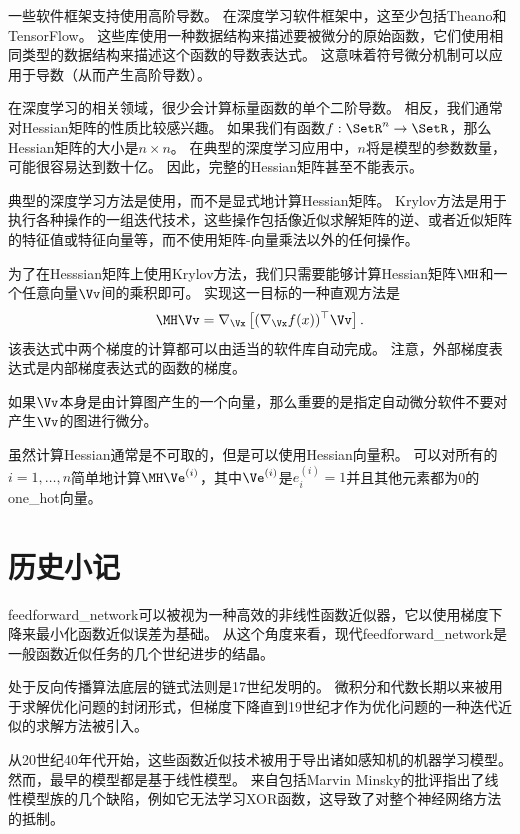 一些软件框架支持使用高阶导数。 
在深度学习软件框架中，这至少包括Theano和TensorFlow。
这些库使用一种数据结构来描述要被微分的原始函数，它们使用相同类型的数据结构来描述这个函数的导数表达式。
这意味着符号微分机制可以应用于导数（从而产生高阶导数）。

在深度学习的相关领域，很少会计算标量函数的单个二阶导数。
相反，我们通常对Hessian矩阵的性质比较感兴趣。
如果我们有函数$f:\SetR^n \to \SetR$，那么Hessian矩阵的大小是$n\times n$。
在典型的深度学习应用中，$n$将是模型的参数数量，可能很容易达到数十亿。
因此，完整的Hessian矩阵甚至不能表示。

典型的深度学习方法是使用，而不是显式地计算Hessian矩阵。
Krylov方法是用于执行各种操作的一组迭代技术，这些操作包括像近似求解矩阵的逆、或者近似矩阵的特征值或特征向量等，而不使用矩阵-向量乘法以外的任何操作。

为了在Hesssian矩阵上使用Krylov方法，我们只需要能够计算Hessian矩阵$\MH$和一个任意向量$\Vv$间的乘积即可。
实现这一目标的一种直观方法\citep{Christianson-1992}是
\begin{equation}
  \MH \Vv=\nabla_{\Vx} \left [ (\nabla_{\Vx} f(x))^\top \Vv\right ].
\end{equation}
该表达式中两个梯度的计算都可以由适当的软件库自动完成。
注意，外部梯度表达式是内部梯度表达式的函数的梯度。

如果$\Vv$本身是由计算图产生的一个向量，那么重要的是指定自动微分软件不要对产生$\Vv$的图进行微分。

虽然计算Hessian通常是不可取的，但是可以使用Hessian向量积。
可以对所有的$i=1,\ldots,n$简单地计算$\MH \Ve^{(i)}$，其中$\Ve^{(i)}$是$e_i^{(i)}=1$并且其他元素都为0的\gls{one_hot}向量。

\section{历史小记}
\label{sec:historical_notes}

\gls{feedforward_network}可以被视为一种高效的非线性函数近似器，它以使用梯度下降来最小化函数近似误差为基础。
从这个角度来看，现代\gls{feedforward_network}是一般函数近似任务的几个世纪进步的结晶。
  
  
处于反向传播算法底层的链式法则是17世纪发明的\citep{Leibniz-1676,L'Hopital-1696}。
微积分和代数长期以来被用于求解优化问题的封闭形式，但梯度下降直到19世纪才作为优化问题的一种迭代近似的求解方法被引入\citep{Cauchy-1847}。

从20世纪40年代开始，这些函数近似技术被用于导出诸如感知机的机器学习模型。 
然而，最早的模型都是基于线性模型。 
来自包括Marvin Minsky的批评指出了线性模型族的几个缺陷，例如它无法学习XOR函数，这导致了对整个神经网络方法的抵制。

